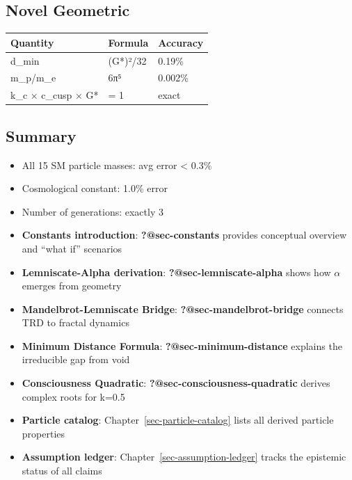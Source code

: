 \documentclass[
  11pt,
  letterpaper,
  twoside,
  openany]{book}
\makeatletter
\providecommand{\tightlist}{%
  \setlength{\itemsep}{0pt}\setlength{\parskip}{0pt}}
\let\orig@subsection\subsection
\renewcommand{\subsection}{\needspace{6\baselineskip}\orig@subsection}
\makeatother
\begin{document}
\subsection{Novel Geometric}\label{novel-geometric}

\begin{longtable}[]{@{}lll@{}}
\toprule\noalign{}
Quantity & Formula & Accuracy \\
\midrule\noalign{}
\endhead
\bottomrule\noalign{}
\endlastfoot
d\_min & (G*)²/32 & 0.19\% \\
m\_p/m\_e & 6π⁵ & 0.002\% \\
k\_c × c\_cusp × G* & = 1 & exact \\
\end{longtable}

\subsection{Summary}\label{summary-3}

\begin{itemize}
\tightlist
\item
  All 15 SM particle masses: avg error \textless{} 0.3\%
\item
  Cosmological constant: 1.0\% error
\item
  Number of generations: exactly 3
\end{itemize}

\begin{tcolorbox}[enhanced jigsaw, colbacktitle=quarto-callout-tip-color!10!white, titlerule=0mm, bottomtitle=1mm, bottomrule=.15mm, colback=white, arc=.35mm, breakable, toprule=.15mm, title=\textcolor{quarto-callout-tip-color}{\faLightbulb}\hspace{0.5em}{Related Topics}, rightrule=.15mm, coltitle=black, leftrule=.75mm, colframe=quarto-callout-tip-color-frame, toptitle=1mm, opacityback=0, opacitybacktitle=0.6, left=2mm]

\begin{itemize}
\tightlist
\item
  \textbf{Constants introduction}: \textbf{?@sec-constants} provides
  conceptual overview and ``what if'' scenarios
\item
  \textbf{Lemniscate-Alpha derivation}: \textbf{?@sec-lemniscate-alpha}
  shows how \(\alpha\) emerges from geometry
\item
  \textbf{Mandelbrot-Lemniscate Bridge}:
  \textbf{?@sec-mandelbrot-bridge} connects TRD to fractal dynamics
\item
  \textbf{Minimum Distance Formula}: \textbf{?@sec-minimum-distance}
  explains the irreducible gap from void
\item
  \textbf{Consciousness Quadratic}:
  \textbf{?@sec-consciousness-quadratic} derives complex roots for k=0.5
\item
  \textbf{Particle catalog}: Chapter~\ref{sec-particle-catalog} lists
  all derived particle properties
\item
  \textbf{Assumption ledger}: Chapter~\ref{sec-assumption-ledger} tracks
  the epistemic status of all claims
\end{itemize}

\end{tcolorbox}
\end{document}
